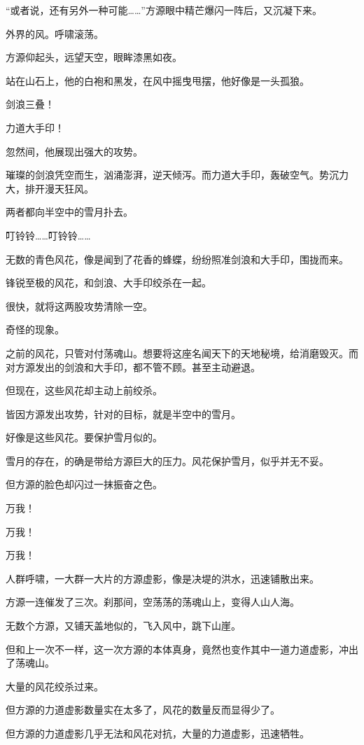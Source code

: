 \begin{this_body}
“或者说，还有另外一种可能……”方源眼中精芒爆闪一阵后，又沉凝下来。

外界的风。呼啸滚荡。

方源仰起头，远望天空，眼眸漆黑如夜。

站在山石上，他的白袍和黑发，在风中摇曳甩摆，他好像是一头孤狼。

剑浪三叠！

力道大手印！

忽然间，他展现出强大的攻势。

璀璨的剑浪凭空而生，汹涌澎湃，逆天倾泻。而力道大手印，轰破空气。势沉力大，排开漫天狂风。

两者都向半空中的雪月扑去。

叮铃铃……叮铃铃……

无数的青色风花，像是闻到了花香的蜂蝶，纷纷照准剑浪和大手印，围拢而来。

锋锐至极的风花，和剑浪、大手印绞杀在一起。

很快，就将这两股攻势清除一空。

奇怪的现象。

之前的风花，只管对付荡魂山。想要将这座名闻天下的天地秘境，给消磨毁灭。而对方源发出的剑浪和大手印，都不管不顾。甚至主动避退。

但现在，这些风花却主动上前绞杀。

皆因方源发出攻势，针对的目标，就是半空中的雪月。

好像是这些风花。要保护雪月似的。

雪月的存在，的确是带给方源巨大的压力。风花保护雪月，似乎并无不妥。

但方源的脸色却闪过一抹振奋之色。

万我！

万我！

万我！

人群呼啸，一大群一大片的方源虚影，像是决堤的洪水，迅速铺散出来。

方源一连催发了三次。刹那间，空荡荡的荡魂山上，变得人山人海。

无数个方源，又铺天盖地似的，飞入风中，跳下山崖。

但和上一次不一样，这一次方源的本体真身，竟然也变作其中一道力道虚影，冲出了荡魂山。

大量的风花绞杀过来。

但方源的力道虚影数量实在太多了，风花的数量反而显得少了。

但方源的力道虚影几乎无法和风花对抗，大量的力道虚影，迅速牺牲。


\end{this_body}
